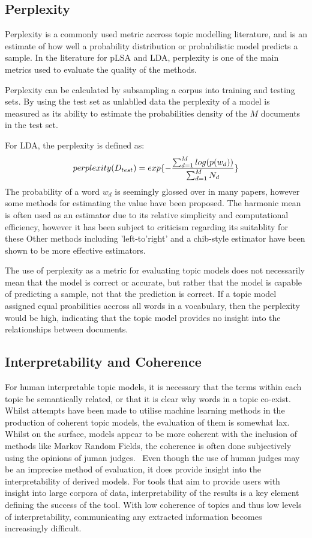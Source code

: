 \documentclass[10pt]{report}
\begin{document}
\subsection{Perplexity}
Perplexity is a commonly used metric accross topic modelling literature, and is an estimate of how well a probability distribution or probabilistic model predicts a sample. In the literature for pLSA and LDA, perplexity is one of the main metrics used to evaluate the quality of the methods.~\cite{Blei2003-dj,Hofmann1999-qb} 

Perplexity can be calculated by subsampling a corpus into training and testing sets. By using the test set as unlablled data the perplexity of a model is measured as its ability to estimate the probabilities density of the \(M\) documents in the test set.

\renewcommand{\baselinestretch}{1.0}\normalsize
For LDA, the perplexity is defined as:
\[
  perplexity(D_{test}) = exp\{-{{\sum^{M}_{d=1} log(p(w_d))}\over{\sum^{M}_{d=1} N_d}}\}
\]
\renewcommand{\baselinestretch}{2.0}\normalsize
The probability of a word \(w_d\) is seemingly glossed over in many papers, however some methods for estimating the value have been proposed. The harmonic mean is often used as an estimator due to its relative simplicity and computational efficiency, however it has been subject to criticism regarding its suitablity for these Other methods including 'left-to'right' and a chib-style estimator have been shown to be more effective estimators.~\cite{Newton1994-ws,Wallach2008-ti,Chib1995-wq,Wallach2009-ot}

The use of perplexity as a metric for evaluating topic models does not necessarily mean that the model is correct or accurate, but rather that the model is capable of predicting a sample, not that the prediction is correct. If a topic model assigned equal proabilities accross all words in a vocabulary, then the perplexity would be high, indicating that the topic model provides no insight into the relationships between documents.

\subsection{Interpretability and Coherence}
For human interpretable topic models, it is necessary that the terms within each topic be semantically related, or that it is clear why words in a topic co-exist. Whilst attempts have been made to utilise machine learning methods in the production of coherent topic models, the evaluation of them is somewhat lax. Whilst on the surface, models appear to be more coherent with the inclusion of methods like Markov Random Fields, the coherence is often done subjectively using the opinions of juman judges.~\cite{Xie2015-wv} Even though the use of human judges may be an imprecise method of evaluation, it does provide insight into the interpretability of derived models. For tools that aim to provide users with insight into large corpora of data, interpretability of the results is a key element defining the success of the tool. With low coherence of topics and thus low levels of interpretability, communicating any extracted information becomes increasingly difficult.
\end{document}
